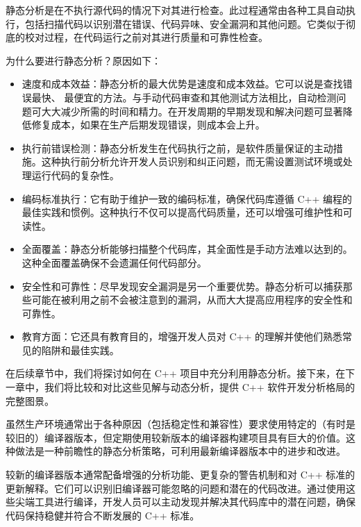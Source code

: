 
静态分析是在不执行源代码的情况下对其进行检查。此过程通常由各种工具自动执行，包括扫描代码以识别潜在错误、代码异味、安全漏洞和其他问题。它类似于彻底的校对过程，在代码运行之前对其进行质量和可靠性检查。

为什么要进行静态分析？原因如下：

\begin{itemize}
\item
速度和成本效益：静态分析的最大优势是速度和成本效益。它可以说是查找错误最快、 最便宜的方法。与手动代码审查和其他测试方法相比，自动检测问题可大大减少所需的时间和精力。在开发周期的早期发现和解决问题可显著降低修复成本，如果在生产后期发现错误，则成本会上升。

\item
执行前错误检测：静态分析发生在代码执行之前，是软件质量保证的主动措施。这种执行前分析允许开发人员识别和纠正问题，而无需设置测试环境或处理运行代码的复杂性。

\item
编码标准执行：它有助于维护一致的编码标准，确保代码库遵循 C++ 编程的最佳实践和惯例。这种执行不仅可以提高代码质量，还可以增强可维护性和可读性。

\item
全面覆盖：静态分析能够扫描整个代码库，其全面性是手动方法难以达到的。这种全面覆盖确保不会遗漏任何代码部分。

\item
安全性和可靠性：尽早发现安全漏洞是另一个重要优势。静态分析可以捕获那些可能在被利用之前不会被注意到的漏洞，从而大大提高应用程序的安全性和可靠性。

\item
教育方面：它还具有教育目的，增强开发人员对 C++ 的理解并使他们熟悉常见的陷阱和最佳实践。
\end{itemize}

在后续章节中，我们将探讨如何在 C++ 项目中充分利用静态分析。接下来，在下一章中，我们将比较和对比这些见解与动态分析，提供 C++ 软件开发分析格局的完整图景。


虽然生产环境通常出于各种原因（包括稳定性和兼容性）要求使用特定的（有时是较旧的）编译器版本，但定期使用较新版本的编译器构建项目具有巨大的价值。这种做法是一种前瞻性的静态分析策略，可利用最新编译器版本中的进步和改进。

较新的编译器版本通常配备增强的分析功能、更复杂的警告机制和对 C++ 标准的更新解释。它们可以识别旧编译器可能忽略的问题和潜在的代码改进。通过使用这些尖端工具进行编译，开发人员可以主动发现并解决其代码库中的潜在问题，确保代码保持稳健并符合不断发展的 C++ 标准。

